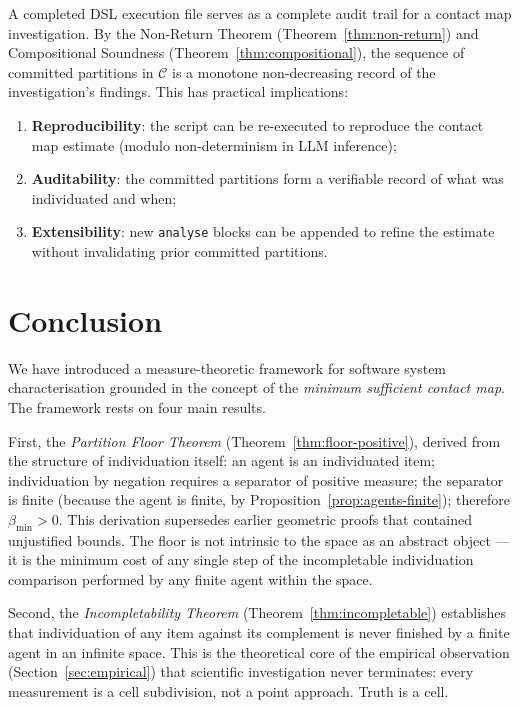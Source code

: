 \documentclass[12pt,a4paper,twocolumn]{article}
\theoremstyle{plain}
\theoremstyle{definition}
\theoremstyle{remark}
\newcommand{\bmin}{\beta_{\min}}
\begin{document}
A completed DSL execution file serves as a complete audit trail for a contact
map investigation.  By the Non-Return Theorem (Theorem~\ref{thm:non-return})
and Compositional Soundness (Theorem~\ref{thm:compositional}), the sequence of
committed partitions in $\mathcal{C}$ is a monotone non-decreasing record of
the investigation's findings.  This has practical implications:

\begin{enumerate}[label=(\roman*)]
  \item \textbf{Reproducibility}: the script can be re-executed to reproduce
    the contact map estimate (modulo non-determinism in LLM inference);
  \item \textbf{Auditability}: the committed partitions form a verifiable
    record of what was individuated and when;
  \item \textbf{Extensibility}: new \texttt{analyse} blocks can be appended
    to refine the estimate without invalidating prior committed partitions.
\end{enumerate}

\section{Conclusion}
\label{sec:conclusion}

We have introduced a measure-theoretic framework for software system
characterisation grounded in the concept of the \emph{minimum sufficient
contact map}.  The framework rests on four main results.

First, the \emph{Partition Floor Theorem} (Theorem~\ref{thm:floor-positive}),
derived from the structure of individuation itself: an agent is an
individuated item; individuation by negation requires a separator of positive
measure; the separator is finite (because the agent is finite, by
Proposition~\ref{prop:agents-finite}); therefore $\bmin > 0$.  This
derivation supersedes earlier geometric proofs that contained unjustified
bounds.  The floor is not intrinsic to the space as an abstract object ---
it is the minimum cost of any single step of the incompletable individuation
comparison performed by any finite agent within the space.

Second, the \emph{Incompletability Theorem} (Theorem~\ref{thm:incompletable})
establishes that individuation of any item against its complement is never
finished by a finite agent in an infinite space.  This is the theoretical
core of the empirical observation (Section~\ref{sec:empirical}) that
scientific investigation never terminates: every measurement is a cell
subdivision, not a point approach.  Truth is a cell.
\end{document}
